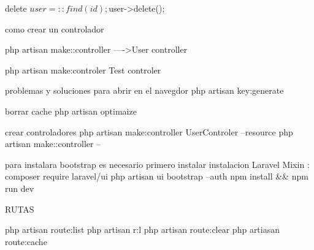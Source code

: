 delete
$user=::find(id);
$user->delete();


como crear un controlador 

php artisan make::controller  ---->User controller

php artisan make:controler  Test controler 




problemas  y soluciones para abrir en el navegdor
php artisan key:generate


borrar cache 
php artisan optimaize




crear controladores
php artisan make:controller  UserControler --resource
php artisan make::controller -- 



para instalara bootstrap es necesario primero instalar 
instalacion Laravel Mixin :
composer require laravel/ui
php artisan ui bootstrap --auth
npm install && npm run dev 



RUTAS

php artisan route:list 
php artisan r:l
php artisan route:clear
php artiasan route:cache


